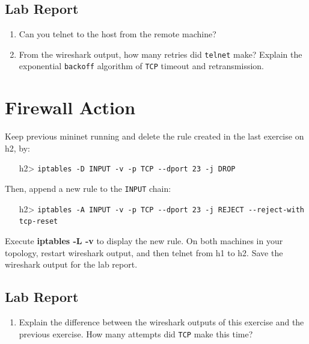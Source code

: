 \documentclass[10pt,a4paper]{article}
\numberwithin{equation}{section}
\numberwithin{figure}{section}
\numberwithin{table}{section}
\begin{document}
	\subsection{Lab Report}
	\begin{enumerate}
		\setlength{\itemindent}{0pt}
		\item Can you telnet to the host from the remote machine?
		\item From the wireshark output, how many retries did \texttt{telnet} make? Explain the exponential \texttt{backoff} algorithm of \texttt{TCP} timeout and retransmission.
	\end{enumerate}
	
	\section{Firewall Action}
	Keep previous mininet running and delete the rule created in the last exercise on h2, by:
	
	\begin{itemize}
		\setlength{\itemindent}{10pt}
		\item [h2>] \texttt{iptables -D INPUT -v -p TCP -{}-dport 23 -j DROP}
	\end{itemize}
	
	\setlength{\parindent}{0pt}
	Then, append a new rule to the \texttt{INPUT} chain:
	
	\begin{itemize}
		\setlength{\itemindent}{10pt}
		\item [h2>] \texttt{iptables -A INPUT -v -p TCP -{}-dport 23 -j REJECT -{}-reject-with tcp-reset} 
	\end{itemize}
	
	\setlength{\parindent}{0pt}
	Execute \textbf{iptables -L -v} to display the new rule. On both machines in your topology, restart wireshark output, and then telnet from h1 to h2. Save the wireshark output for the lab report.
	
	\subsection{Lab Report}
	\begin{enumerate}
		\setlength{\itemindent}{0pt}
		\item Explain the difference between the wireshark outputs of this exercise and the previous exercise. How many attempts did \texttt{TCP} make this time?
	\end{enumerate}
	
	\pagebreak
	
\end{document}
